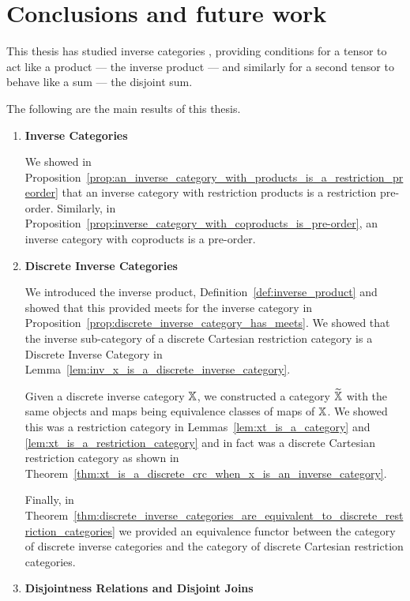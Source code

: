 \chapter{Conclusions and future work} %
\label{cha:conclusions_and_future_work}

This thesis has studied inverse categories \cite{cockett2002:restcategories1}, providing conditions
for a tensor to act like a product --- the inverse product --- and similarly for a second
tensor to behave like a sum --- the disjoint sum.

The following are the main results of this thesis.

\begin{enumerate}
\item \textbf{Inverse Categories}

We showed in Proposition~\ref{prop:an_inverse_category_with_products_is_a_restriction_preorder} that
an inverse category with restriction products is a restriction pre-order. Similarly, in
Proposition~\ref{prop:inverse_category_with_coproducts_is_pre-order}, an inverse category with
coproducts is a pre-order.

\item \textbf{Discrete Inverse Categories}

We introduced the inverse product, Definition~\ref{def:inverse_product} and showed that this
provided meets for the inverse category in
Proposition~\ref{prop:discrete_inverse_category_has_meets}. We showed that the inverse sub-category
of a discrete Cartesian restriction category is a Discrete Inverse Category in
Lemma~\ref{lem:inv_x_is_a_discrete_inverse_category}.

Given a discrete inverse category $\mathbb{X}$, we constructed a category $\widetilde{\mathbb{X}}$ with the same objects and
maps being equivalence classes of maps of $\mathbb{X}$. We showed this was a restriction category in
Lemmas~\ref{lem:xt_is_a_category} and \ref{lem:xt_is_a_restriction_category} and in fact was a
discrete Cartesian restriction category as shown in
Theorem~\ref{thm:xt_is_a_discrete_crc_when_x_is_an_inverse_category}.

Finally, in
Theorem~\ref{thm:discrete_inverse_categories_are_equivalent_to_discrete_restriction_categories} we
provided an equivalence functor between the category of discrete inverse categories and the category
of discrete Cartesian restriction categories.

\item \textbf{Disjointness Relations and Disjoint Joins}


\end{enumerate}
